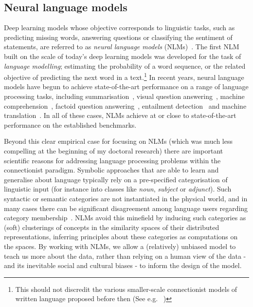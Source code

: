 \documentclass[11pt,letterpaper]{article}
\begin{document}
\subsection{Neural language models} Deep learning models whose objective corresponds to linguistic tasks, such as predicting missing words, answering questions or classifying the sentiment of statements, are referred to as \emph{neural language models} (NLMs)~\citep{bengio2003neural}. The first NLM built on the scale of today's deep learning models was developed for the task of \emph{language modelling}; estimating the probability of a word sequence, or the related objective of predicting the next word in a text.\footnote{This should not discredit the various smaller-scale connectionist models of written language proposed before then (See e.g. ~\citealt{elman1990finding,miikkulainen1991natural})} In recent years, neural language models have begun to achieve state-of-the-art performance on a range of language processing tasks, including summarisation~\citep{rush2015neural}, visual question answering~\citep{antol2015vqa}, machine comprehension~\citep{hill2015goldilocks}, factoid question answering~\citep{bordes2014question}, entailment detection~\citep{rocktaschel2015reasoning} and machine translation~\citep{bahdanau2014neural}. In all of these cases, NLMs achieve at or close to state-of-the-art performance on the established benchmarks.  

Beyond this clear empirical case for focusing on NLMs (which was much less compelling at the beginning of my doctoral research) there are important scientific reasons for addressing language processing problems within the connectionist paradigm. Symbolic approaches that are able to learn and generalise about language typically rely on a pre-specified categorisation of linguistic input (for instance into classes like \emph{noun}, \emph{subject} or \emph{adjunct}). Such syntactic or semantic categories are not instantiated in the physical world, and in many cases there can be significant disagreement among language users regarding category membership~\citep{anward1997parts}. NLMs avoid this minefield by inducing such categories as (soft) clusterings of concepts in the similarity spaces of their distributed representations, inferring principles about these categories as computations on the spaces. By working with NLMs, we allow a (relatively) unbiased model to teach us more about the data, rather than relying on a human view of the data - and its inevitable social and cultural biases - to inform the design of the model. 
\end{document}
